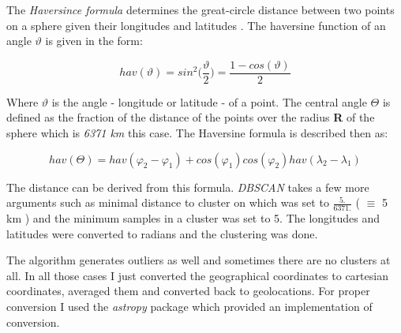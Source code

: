 \documentclass[a4paper,12pt]{article}
\begin{document}
\vspace{.2cm}

\par The \textit{Haversince formula} determines the great-circle distance 
between two points on a sphere given their longitudes and latitudes \cite{wiki_haversine}.
The haversine function of an angle $\vartheta$ is given in the form:

\vspace{.2cm}

\begin{equation*}
	hav(\vartheta) = sin^{2}\Big(\frac{\vartheta}{2}\Big) = \frac{1-cos(\vartheta)}{2}
\end{equation*}

\vspace{.2cm}

\par Where $\vartheta$ is the angle - longitude or latitude - of a point. The central angle
$\Theta$ is defined as the fraction of the distance of the points over the radius \textbf{R}
of the sphere which is \textit{6371 km} this case. The Haversine formula is described then as:

\vspace{.2cm}

\begin{equation*}
	hav(\Theta) = hav(\varphi_{2} - \varphi_{1}) + cos(\varphi_{1})cos(\varphi_{2})hav(\lambda_{2} - \lambda_{1})
\end{equation*}

\vspace{.2cm}

\par The distance can be derived from this formula. \textit{DBSCAN} takes a few more
arguments such as minimal distance to cluster on which was set to $\frac{5.}{6371.}$
( $\equiv$ 5 km ) and the minimum samples in a cluster was set to 5. The longitudes and latitudes
were converted to radians and the clustering was done.

\vspace{.2cm}

\par The algorithm generates outliers as well and sometimes there are no clusters at all. In all
those cases I just converted the geographical coordinates to cartesian coordinates, averaged them
and converted back to geolocations. For proper conversion I used the \textit{astropy} package
which provided an implementation of conversion.

\vspace{.2cm}
\end{document}

